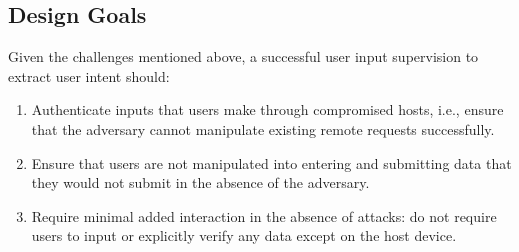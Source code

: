 \begin{enumerate}
\end{enumerate}

\subsection{Design Goals}
\label{sec:systemDesign:designgolaks}

 Given the challenges mentioned above, a successful user input supervision to extract user intent should:

\begin{enumerate}
	\item Authenticate inputs that users make through compromised hosts, i.e., ensure that the adversary cannot manipulate existing remote requests successfully.

	\item Ensure that users are not manipulated into entering and submitting data that they would not submit in the absence of the adversary.

	\item Require minimal added interaction in the absence of attacks: do not require users to input or explicitly verify any data except on the host device.
\end{enumerate}